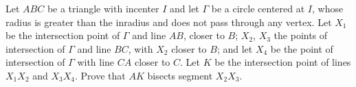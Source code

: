 Let $ ABC$ be a triangle with incenter $ I$ and let $ \Gamma$ be a circle centered at $ I$,  whose radius is greater than the inradius and does not pass through any vertex. Let $ X_{1}$ be the intersection point of $ \Gamma$ and line $ AB$,  closer to $ B$; $ X_{2}$,  $ X_{3}$ the points of intersection of $ \Gamma$ and line $ BC$,  with $ X_{2}$ closer to $ B$; and let $ X_{4}$ be the point of intersection of $ \Gamma$ with line $ CA$ closer to $ C$. Let $ K$ be the intersection point of lines $ X_{1}X_{2}$ and $ X_{3}X_{4}$. Prove that $ AK$ bisects segment $ X_{2}X_{3}$.